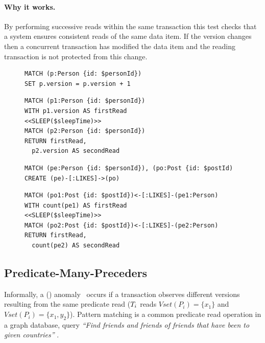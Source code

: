 \paragraph{Why it works.}
By performing successive reads within the same transaction this test checks that a system ensures consistent reads of the same data item.
If the version changes then a concurrent transaction has modified the data item and the reading transaction is not protected from this change.

\begin{figure}[htb]
\centering
\begin{minipage}{0.35\linewidth}
\begin{lstlisting}[language=cypher,label=fig:ic1,caption=\tx{IMP $T_\mathrm{W}$}.]
MATCH (p:Person {id: $personId})
SET p.version = p.version + 1
\end{lstlisting}
\begin{lstlisting}[language=cypher,label=fig:ic2,caption=\tx{IMP $T_\mathrm{R}$}.]
MATCH (p1:Person {id: $personId})
WITH p1.version AS firstRead
<<SLEEP($sleepTime)>>
MATCH (p2:Person {id: $personId})
RETURN firstRead,
  p2.version AS secondRead
\end{lstlisting}
\end{minipage}
\quad
\begin{minipage}{0.61\linewidth}
\begin{lstlisting}[language=cypher,label=fig:pc1,caption=\tx{PMP $T_\mathrm{W}$}.]
MATCH (pe:Person {id: $personId}), (po:Post {id: $postId)
CREATE (pe)-[:LIKES]->(po)
\end{lstlisting}
\begin{lstlisting}[language=cypher,label=fig:pc2,caption=\tx{PMP $T_\mathrm{R}$}.]
MATCH (po1:Post {id: $postId})<-[:LIKES]-(pe1:Person)
WITH count(pe1) AS firstRead
<<SLEEP($sleepTime)>>
MATCH (po2:Post {id: $postId})<-[:LIKES]-(pe2:Person)
RETURN firstRead,
  count(pe2) AS secondRead
\end{lstlisting}
\end{minipage}
\end{figure}

\subsection*{Predicate-Many-Preceders}

Informally, a  () anomaly~\cite{DBLP:journals/pvldb/BailisDFGHS13} occurs if a transaction observes different versions resulting from the same predicate read
(\eg $T_i$ reads
$\textit{Vset}(P_i) =  \{x_1\}$ and
$\textit{Vset}(P_i) = \{x_1,y_2\}$).
Pattern matching is a common predicate read operation in a graph database, \eg query \emph{``Find friends and friends of friends that have been to given countries''} .

